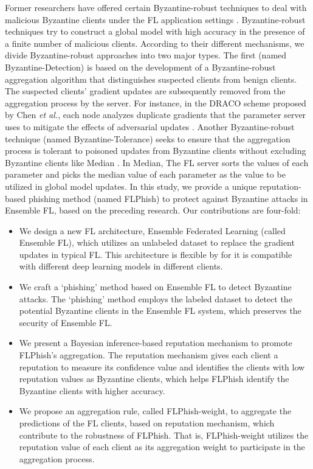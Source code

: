 \documentclass[journal]{IEEEtran}
\begin{document}
\par Former researchers have offered certain Byzantine-robust techniques to deal with malicious Byzantine clients under the FL application settings \cite{ref_12_defense,ref_13_defense,ref_15_defense,ref_16_defense,ref_17_defense,ref_28_defense,ref_29_defense,ref_30_defense,ref_31_defense,ref_32_defense}. Byzantine-robust techniques try to construct a global model with high accuracy in the presence of a finite number of malicious clients. According to their different mechanisms, we divide Byzantine-robust approaches into two major types. The first (named Byzantine-Detection) is based on the development of a Byzantine-robust aggregation algorithm that distinguishes suspected clients from benign clients. The suspected clients' gradient updates are subsequently removed from the aggregation process by the server. For instance, in the DRACO scheme proposed by Chen \textit{et al.}, each node analyzes duplicate gradients that the parameter server uses to mitigate the effects of adversarial updates \cite{ref_13_defense}. Another Byzantine-robust technique (named Byzantine-Tolerance) seeks to ensure that the aggregation process is tolerant to poisoned updates from Byzantine clients without excluding Byzantine clients like Median \cite{ref_16_defense}. In Median, The FL server sorts the values of each parameter and picks the median value of each parameter as the value to be utilized in global model updates. In this study, we provide a unique reputation-based phishing method (named FLPhish) to protect against Byzantine attacks in Ensemble FL, based on the preceding research. Our contributions are four-fold:
\begin{itemize}
  \item We design a new FL architecture, Ensemble Federated Learning (called Ensemble FL), which utilizes an unlabeled dataset to replace the gradient updates in typical FL. This architecture is flexible by for it is compatible with different deep learning models in different clients.
  \item We craft a `phishing' method based on Ensemble FL to detect Byzantine attacks. The `phishing' method employs the labeled dataset to detect the potential Byzantine clients in the Ensemble FL system, which preserves the security of Ensemble FL.
  \item We present a Bayesian inference-based reputation mechanism to promote FLPhish's aggregation. The reputation mechanism gives each client a reputation to measure its confidence value and identifies the clients with low reputation values as Byzantine clients, which helps FLPhish identify the Byzantine clients with higher accuracy.
  \item We propose an aggregation rule, called FLPhish-weight, to aggregate the predictions of the FL clients, based on reputation mechanism, which contribute to the robustness of FLPhish. That is, FLPhish-weight utilizes the reputation value of each client as its aggregation weight to participate in the aggregation process.
\end{itemize}
\end{document}
